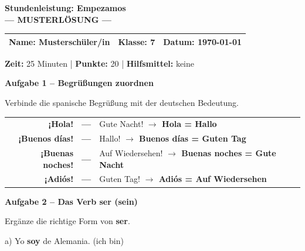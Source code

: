 \documentclass[11pt, a4paper]{article}
\newcommand{\fachfarbe}{spanisch}
\newcommand{\thema}{Stundenleistung: Empezamos}
\newcommand{\klasse}{7}
\newcommand{\maxpunkte}{20}
\newcommand{\zeit}{25 Minuten}
\newcommand{\datum}{\today}
\newcommand{\punktebox}[1]{\hfill\fbox{\small \_/#1}}
\newcommand{\lsg}[1]{\textcolor{loesung}{\textbf{#1}}}
\newenvironment{aufgabe}[1]{%
    \needspace{5\baselineskip}%
    \nopagebreak[4]%
    \vspace{10pt}
    \noindent\textbf{\textcolor{\fachfarbe}{Aufgabe #1}}
    \nopagebreak[4]%
    \vspace{5pt}
    \nopagebreak[4]%
    \begin{list}{}{\leftmargin=0pt}
    \item[]
}{%
    \end{list}
}
\newcommand{\es}[1]{\textcolor{\fachfarbe}{\textbf{#1}}}
\begin{document}
\begin{center}
    {\Large\bfseries\textcolor{\fachfarbe}{\thema}}\\[0.3em]
    {\large\textcolor{loesung}{\textbf{--- MUSTERLÖSUNG ---}}}
\end{center}

\vspace{5pt}

\noindent
\begin{tabularx}{\textwidth}{|X|X|X|}
\hline
\textbf{Name:} \lsg{Musterschüler/in} &
\textbf{Klasse:} \klasse &
\textbf{Datum:} \datum \\
\hline
\end{tabularx}

\vspace{10pt}

\begin{infobox}
\textbf{Zeit:} \zeit{} | \textbf{Punkte:} \maxpunkte{} | \textbf{Hilfsmittel:} keine
\end{infobox}

\vspace{15pt}

\begin{aufgabe}{1 -- Begrüßungen zuordnen}
Verbinde die spanische Begrüßung mit der deutschen Bedeutung. \punktebox{4}
\end{aufgabe}

\begin{center}
\begin{tabular}{rcl}
\es{¡Hola!} & \lsg{---} & Gute Nacht! \lsg{$\rightarrow$ Hola = Hallo} \\[0.8em]
\es{¡Buenos días!} & \lsg{---} & Hallo! \lsg{$\rightarrow$ Buenos días = Guten Tag} \\[0.8em]
\es{¡Buenas noches!} & \lsg{---} & Auf Wiedersehen! \lsg{$\rightarrow$ Buenas noches = Gute Nacht} \\[0.8em]
\es{¡Adiós!} & \lsg{---} & Guten Tag! \lsg{$\rightarrow$ Adiós = Auf Wiedersehen} \\
\end{tabular}
\end{center}

\vspace{15pt}

\begin{aufgabe}{2 -- Das Verb \es{ser} (sein)}
Ergänze die richtige Form von \es{ser}. \punktebox{4}
\end{aufgabe}

\noindent
a) Yo \lsg{soy} de Alemania. \hfill (ich bin)
\end{document}
